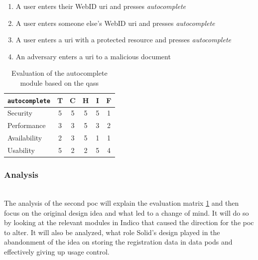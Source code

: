 \begin{enumerate}
    \item A user enters their WebID \gls{uri} and presses \textit{autocomplete}
    \item A user enters someone else's WebID \gls{uri} and presses \textit{autocomplete}
    \item A user enters a \gls{uri} with a protected resource and presses \textit{autocomplete}
    \item An adversary enters a \gls{uri} to a malicious document
\end{enumerate}

\begin{table}[h!]
    \centering
    \begin{tabular}{| l | c | c | c | c | c |} 
     \hline
     \texttt{autocomplete} & T & C & H & I & F \\
     \hline
     Security & 5 & 5 & 5 & 5 & \cellcolor{green!25}1\\
     \hline
     Performance & 3 & 3 & 5 & 3 & \cellcolor{green!25}2\\
     \hline
     Availability & 2 & 3 & 5 & 1 & \cellcolor{green!25}1\\
     \hline
     Usability & 5 & 2 & 2 & 5 & \cellcolor{red!25}4\\
     \hline
    \end{tabular}
    \vspace{0.75cm}
    \caption{Evaluation of the autocomplete module based on the \glspl{qas}}
    \label{table:poc2-evaluation}
\end{table}
\subsubsection{Analysis}\label{poc2:analysis}\mbox{}\\

The analysis of the second \gls{poc} will explain the evaluation matrix \ref{table:poc2-evaluation} and then focus on the original design idea and what led to a change of mind. It will do so by looking at the relevant modules in Indico that caused the direction for the \gls{poc} to alter. It will also be analyzed, what role Solid's design played in the abandonment of the idea on storing the registration data in data pods and effectively giving up usage control.

\vspace{0.5cm}

